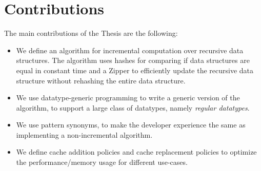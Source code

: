 \section{Contributions}

The main contributions of the Thesis are the following:

\begin{itemize}
    \item We define an algorithm for incremental computation over recursive data structures. The algorithm uses hashes for comparing if data structures are equal in constant time and a Zipper to efficiently update the recursive data structure without rehashing the entire data structure.
    \item We use datatype-generic programming to write a generic version of the algorithm, to support a large class of datatypes, namely \textit{regular datatypes}.
    \item We use pattern synonyms, to make the developer experience the same as implementing a non-incremental algorithm.
    \item We define cache addition policies and cache replacement policies to optimize the performance/memory usage for different use-cases.
\end{itemize}
